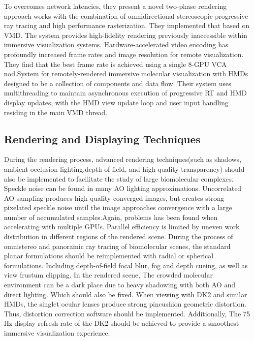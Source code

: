 \documentclass[10pt,twocolumn,letterpaper]{article}
\begin{document}
To overcomes network latencies, they present a novel two-phase rendering approach works with the combination of omnidirectional stereoscopic progressive ray tracing and high performance rasterization. They implemented that based on VMD. The system provides high-fidelity rendering previously inaccessible within immersive visualization systems. Hardware-accelerated video encoding has profoundly increased frame rates and image resolution for remote visualization. They find that the best frame rate is achieved using a single 8-GPU VCA nod.System for remotely-rendered immersive molecular visualization with HMDs designed to be a collection of components and data flow. Their system uses multithreading to maintain asynchronous execution of progressive RT and HMD display updates, with the HMD view update loop and user input handling residing in the main VMD thread.

\subsection{Rendering and Displaying Techniques}

During the rendering process, advanced rendering techniques(such as shadows, ambient occlusion lighting,depth-of-field, and high quality transparency) should also be implemented to facilitate the study of large biomolecular complexes. Speckle noise can be found in many AO lighting approximations. Uncorrelated AO sampling produces high quality converged images, but creates strong pixelated speckle noise until the image approaches convergence with a large number of accumulated samples.Again, problems has been found when accelerating with multiple GPUs. Parallel efficiency is limited by uneven work distribution in different regions of the rendered scene. During the process of omnistereo and panoramic ray tracing of biomolecular scenes, the standard planar formulations should be reimplemented with radial or spherical formulations. Including depth-of-field focal blur, fog and depth cueing, as well as view frustum clipping. In the rendered scene, The crowded molecular environment can be a dark place due to heavy shadowing with both AO and direct lighting. Which should also be fixed. When viewing with DK2 and similar HMDs, the singlet ocular lenses produce strong pincushion geometric distortion. Thus, distortion correction software should be implemented. Additionally, The 75 Hz display refresh rate of the DK2 should be achieved to provide a smoothest immersive visualization experience.
\end{document}
